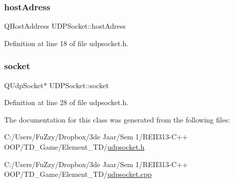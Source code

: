 \subsubsection{\texorpdfstring{host\+Adress}{hostAdress}}
{\footnotesize\ttfamily Q\+Host\+Address U\+D\+P\+Socket\+::host\+Adress}



Definition at line 18 of file udpsocket.\+h.

\mbox{\label{class_u_d_p_socket_a9d27cb09deee765dfec056cfc774c878}} 
\subsubsection{\texorpdfstring{socket}{socket}}
{\footnotesize\ttfamily Q\+Udp\+Socket$\ast$ U\+D\+P\+Socket\+::socket\hspace{0.3cm}{\ttfamily [private]}}



Definition at line 28 of file udpsocket.\+h.



The documentation for this class was generated from the following files\+:\begin{DoxyCompactItemize}
\item 
C\+:/\+Users/\+Fu\+Zzy/\+Dropbox/3de Jaar/\+Sem 1/\+R\+E\+I\+I313-\/\+C++ O\+O\+P/\+T\+D\+\_\+\+Game/\+Element\+\_\+\+T\+D/\hyperlink{udpsocket_8h}{udpsocket.\+h}\item 
C\+:/\+Users/\+Fu\+Zzy/\+Dropbox/3de Jaar/\+Sem 1/\+R\+E\+I\+I313-\/\+C++ O\+O\+P/\+T\+D\+\_\+\+Game/\+Element\+\_\+\+T\+D/\hyperlink{udpsocket_8cpp}{udpsocket.\+cpp}\end{DoxyCompactItemize}
